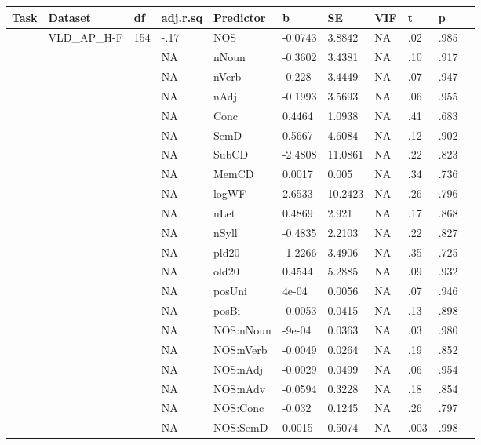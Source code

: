 \begin{table}[ht]
\centering
\begingroup\normalsize
\begin{tabular}{lllllllllll}
  \hline
Task & Dataset & df & adj.r.sq & Predictor & b & SE & VIF & t & p &  \\ 
  \hline
 & VLD\_AP\_H-F & 154 & -.17 & NOS & -0.0743 & 3.8842 & NA & .02 & .985 &   \\ 
   &  &  & NA & nNoun & -0.3602 & 3.4381 & NA & .10 & .917 &   \\ 
   &  &  & NA & nVerb & -0.228 & 3.4449 & NA & .07 & .947 &   \\ 
   &  &  & NA & nAdj & -0.1993 & 3.5693 & NA & .06 & .955 &   \\ 
   &  &  & NA & Conc & 0.4464 & 1.0938 & NA & .41 & .683 &   \\ 
   &  &  & NA & SemD & 0.5667 & 4.6084 & NA & .12 & .902 &   \\ 
   &  &  & NA & SubCD & -2.4808 & 11.0861 & NA & .22 & .823 &   \\ 
   &  &  & NA & MemCD & 0.0017 & 0.005 & NA & .34 & .736 &   \\ 
   &  &  & NA & logWF & 2.6533 & 10.2423 & NA & .26 & .796 &   \\ 
   &  &  & NA & nLet & 0.4869 & 2.921 & NA & .17 & .868 &   \\ 
   &  &  & NA & nSyll & -0.4835 & 2.2103 & NA & .22 & .827 &   \\ 
   &  &  & NA & pld20 & -1.2266 & 3.4906 & NA & .35 & .725 &   \\ 
   &  &  & NA & old20 & 0.4544 & 5.2885 & NA & .09 & .932 &   \\ 
   &  &  & NA & posUni & 4e-04 & 0.0056 & NA & .07 & .946 &   \\ 
   &  &  & NA & posBi & -0.0053 & 0.0415 & NA & .13 & .898 &   \\ 
   &  &  & NA & NOS:nNoun & -9e-04 & 0.0363 & NA & .03 & .980 &   \\ 
   &  &  & NA & NOS:nVerb & -0.0049 & 0.0264 & NA & .19 & .852 &   \\ 
   &  &  & NA & NOS:nAdj & -0.0029 & 0.0499 & NA & .06 & .954 &   \\ 
   &  &  & NA & NOS:nAdv & -0.0594 & 0.3228 & NA & .18 & .854 &   \\ 
   &  &  & NA & NOS:Conc & -0.032 & 0.1245 & NA & .26 & .797 &   \\ 
   &  &  & NA & NOS:SemD & 0.0015 & 0.5074 & NA & .003 & .998 &   \\ 

\end{tabular}
\end{table}

